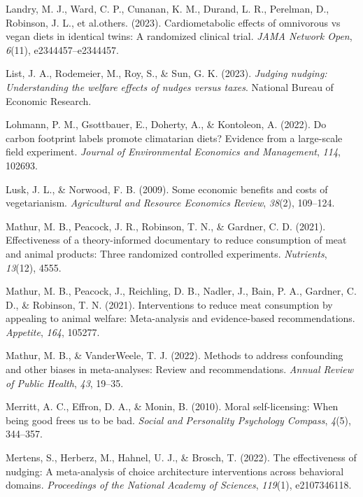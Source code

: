 \documentclass[
  man]{apa6}
\newlength{\cslhangindent}
\newenvironment{CSLReferences}[2] %
 {\begin{list}{}{%
  \setlength{\itemindent}{0pt}
  \setlength{\leftmargin}{0pt}
  \setlength{\parsep}{0pt}
  \ifodd #1
   \setlength{\leftmargin}{\cslhangindent}
   \setlength{\itemindent}{-1\cslhangindent}
  \fi
  \setlength{\itemsep}{#2\baselineskip}}}
 {\end{list}}
\begin{document}
\begin{CSLReferences}{1}{0}
Landry, M. J., Ward, C. P., Cunanan, K. M., Durand, L. R., Perelman, D., Robinson, J. L., et al.others. (2023). Cardiometabolic effects of omnivorous vs vegan diets in identical twins: A randomized clinical trial. \emph{JAMA Network Open}, \emph{6}(11), e2344457--e2344457.

List, J. A., Rodemeier, M., Roy, S., \& Sun, G. K. (2023). \emph{Judging nudging: Understanding the welfare effects of nudges versus taxes}. National Bureau of Economic Research.

Lohmann, P. M., Gsottbauer, E., Doherty, A., \& Kontoleon, A. (2022). Do carbon footprint labels promote climatarian diets? Evidence from a large-scale field experiment. \emph{Journal of Environmental Economics and Management}, \emph{114}, 102693.

Lusk, J. L., \& Norwood, F. B. (2009). Some economic benefits and costs of vegetarianism. \emph{Agricultural and Resource Economics Review}, \emph{38}(2), 109--124.

Mathur, M. B., Peacock, J. R., Robinson, T. N., \& Gardner, C. D. (2021). Effectiveness of a theory-informed documentary to reduce consumption of meat and animal products: Three randomized controlled experiments. \emph{Nutrients}, \emph{13}(12), 4555.

Mathur, M. B., Peacock, J., Reichling, D. B., Nadler, J., Bain, P. A., Gardner, C. D., \& Robinson, T. N. (2021). Interventions to reduce meat consumption by appealing to animal welfare: Meta-analysis and evidence-based recommendations. \emph{Appetite}, \emph{164}, 105277.

Mathur, M. B., \& VanderWeele, T. J. (2022). Methods to address confounding and other biases in meta-analyses: Review and recommendations. \emph{Annual Review of Public Health}, \emph{43}, 19--35.

Merritt, A. C., Effron, D. A., \& Monin, B. (2010). Moral self-licensing: When being good frees us to be bad. \emph{Social and Personality Psychology Compass}, \emph{4}(5), 344--357.

Mertens, S., Herberz, M., Hahnel, U. J., \& Brosch, T. (2022). The effectiveness of nudging: A meta-analysis of choice architecture interventions across behavioral domains. \emph{Proceedings of the National Academy of Sciences}, \emph{119}(1), e2107346118.


\end{CSLReferences}
\end{document}
